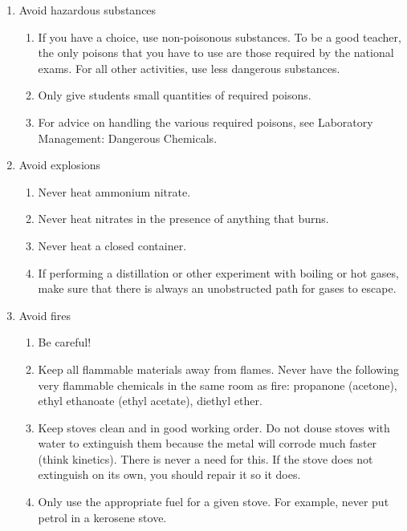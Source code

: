 \begin{enumerate}
\item{Avoid hazardous substances}
\begin{enumerate}
\item{If you have a choice, use non-poisonous substances. 
To be a good teacher, the only poisons that you have to use 
are those required by the national exams. 
For all other activities, use less dangerous substances.}
\item{Only give students small quantities of required poisons.}
\item{For advice on handling the various required poisons, 
see Laboratory Management: Dangerous Chemicals.}
\end{enumerate}

\item{Avoid explosions}
\begin{enumerate}
\item{Never heat ammonium nitrate.}
\item{Never heat nitrates in the presence of anything that burns.}
\item{Never heat a closed container.}
\item{If performing a distillation 
or other experiment with boiling or hot gases, 
make sure that there is always an unobstructed path for gases to escape.}
\end{enumerate}

\item{Avoid fires \label{list:fire}}
\begin{enumerate}
\item{Be careful!}
\item{Keep all flammable materials away from flames. 
Never have the following very flammable chemicals in the same room as fire: 
propanone (acetone), ethyl ethanoate (ethyl acetate), diethyl ether.}
\item{Keep stoves clean and in good working order. 
Do not douse stoves with water to extinguish them 
because the metal will corrode much faster (think kinetics). 
There is never a need for this. 
If the stove does not extinguish on its own, you should repair it so it does.}
\item{Only use the appropriate fuel for a given stove. 
For example, never put petrol in a kerosene stove.}
\end{enumerate}


\end{enumerate}
